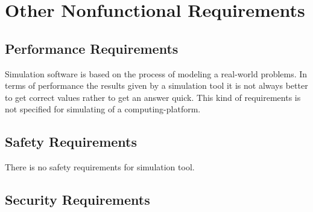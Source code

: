 
\chapter{Other Nonfunctional Requirements} \label{chp:other-nonfunctional-requirements}

\section{Performance Requirements}
	\begin{comment}
		$<$If there are performance requirements for the product under various 
		circumstances, state them here and explain their rationale, to help the 
		developers understand the intent and make suitable design choices. Specify the 
		timing relationships for real time systems. Make such requirements as specific 
		as possible. You may need to state performance requirements for individual 
		functional requirements or features.$>$
	\end{comment}
	
	Simulation software is based on the process of modeling a real-world problems. In terms of performance the results given by a simulation tool it is not always better to get correct values rather to get an answer quick. This kind of requirements is not specified for simulating of a \gls{computing-platform}.
\section{Safety Requirements}
	\begin{comment}
		$<$Specify those requirements that are concerned with possible loss, damage, or 
		harm that could result from the use of the product. Define any safeguards or 
		actions that must be taken, as well as actions that must be prevented. Refer to 
		any external policies or regulations that state safety issues that affect the 
		product’s design or use. Define any safety certifications that must be 
		satisfied.$>$
	\end{comment}
	There is no safety requirements for simulation tool.
\section{Security Requirements}
	\begin{comment}
		$<$Specify any requirements regarding security or privacy issues surrounding use 
		of the product or protection of the data used or created by the product. Define 
		any user identity authentication requirements. Refer to any external policies or 
		regulations containing security issues that affect the product. Define any 
		security or privacy certifications that must be satisfied.$>$
	\end{comment}

